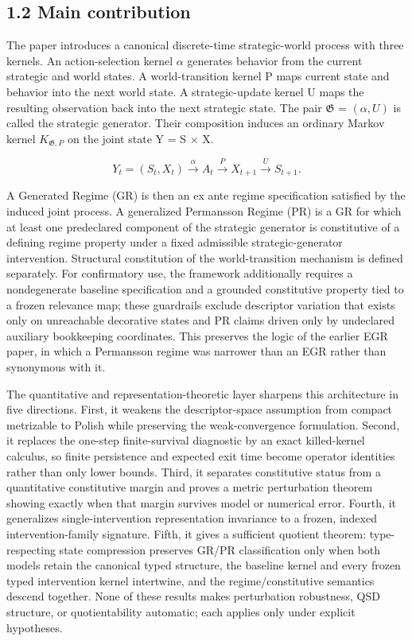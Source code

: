 \documentclass[10pt]{article}
\begin{document}
\subsection{1.2 Main contribution}\label{main-contribution}

The paper introduces a canonical discrete-time strategic-world process
with three kernels. An action-selection kernel \(\alpha\) generates
behavior from the current strategic and world states. A world-transition
kernel P maps current state and behavior into the next world state. A
strategic-update kernel U maps the resulting observation back into the
next strategic state. The pair \(\mathfrak G\) = \((\alpha,U)\) is
called the strategic generator. Their composition induces an ordinary
Markov kernel \(K_{\mathfrak G,P}\) on the joint state Y = S
\(\times{}\) X.

\begin{equation}
Y_t=(S_t,X_t)\xrightarrow{\alpha}A_t\xrightarrow{P}X_{t+1}\xrightarrow{U}S_{t+1}.
\tag{1}\label{eq:1}
\end{equation}

A Generated Regime (GR) is then an ex ante regime specification
satisfied by the induced joint process. A generalized Permansson Regime
(PR) is a GR for which at least one predeclared component of the
strategic generator is constitutive of a defining regime property under
a fixed admissible strategic-generator intervention. Structural
constitution of the world-transition mechanism is defined separately.
For confirmatory use, the framework additionally requires a
nondegenerate baseline specification and a grounded constitutive
property tied to a frozen relevance map; these guardrails exclude
descriptor variation that exists only on unreachable decorative states
and PR claims driven only by undeclared auxiliary bookkeeping
coordinates. This preserves the logic of the earlier EGR paper, in which
a Permansson regime was narrower than an EGR rather than synonymous with
it.


The quantitative and representation-theoretic layer sharpens this architecture in five directions. First, it weakens the descriptor-space assumption from compact metrizable to Polish while preserving the weak-convergence formulation. Second, it replaces the one-step finite-survival diagnostic by an exact killed-kernel calculus, so finite persistence and expected exit time become operator identities rather than only lower bounds. Third, it separates constitutive status from a quantitative constitutive margin and proves a metric perturbation theorem showing exactly when that margin survives model or numerical error. Fourth, it generalizes single-intervention representation invariance to a frozen, indexed intervention-family signature. Fifth, it gives a sufficient quotient theorem: type-respecting state compression preserves GR/PR classification only when both models retain the canonical typed structure, the baseline kernel and every frozen typed intervention kernel intertwine, and the regime/constitutive semantics descend together. None of these results makes perturbation robustness, QSD structure, or quotientability automatic; each applies only under explicit hypotheses.
\end{document}
